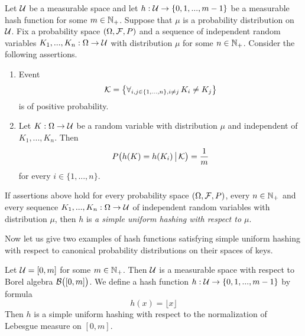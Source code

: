 \begin{definition}
Let ${\mathcal U}$ be a measurable space and let $h:{\mathcal U}\rightarrow \{0,1,...,m-1\}$ be a measurable hash function for some $m\in {\mathbb N}_+$. Suppose that $\mu$ is a probability distribution on ${\mathcal U}$. Fix a probability space $\left(\Omega,{\mathcal F},P\right)$ and a sequence of independent random variables $K_1,...,K_n:\Omega\rightarrow {\mathcal U}$ with distribution $\mu$ for some $n\in {\mathbb N}_+$. Consider the following assertions.
\begin{enumerate}[label=\textbf{(\arabic*)}, leftmargin=3.0em]
\item Event
$${\mathcal K} = \big\{\forall_{i,j\in \{1,...,n\},i\neq j}\,K_i\neq K_j\big\}$$
is of positive probability.
\item Let $K:\Omega\rightarrow {\mathcal U}$ be a random variable with distribution $\mu$ and independent of $K_1,...,K_n$. Then
$$P\big(h(K) = h(K_i)\,\big|\,{\mathcal K}\big) =\frac{1}{m}$$
for every $i\in \{1,...,n\}$.
\end{enumerate}
If assertions above hold for every probability space $(\Omega,{\mathcal F},P)$, every $n\in {\mathbb N}_+$ and every sequence $K_1,...,K_n:\Omega\rightarrow {\mathcal U}$ of independent random variables with distribution $\mu$, then $h$ is \textit{a simple uniform hashing with respect to $\mu$}.
\end{definition}
\noindent
Now let us give two examples of hash functions satisfying simple uniform hashing with respect to canonical probability distributions on their spaces of keys.

\begin{example}\label{example:real_interval_with_floor_hash_function_as_an_example_of_suh}
Let ${\mathcal U} = [0,m]$ for some $m\in {\mathbb N}_+$. Then ${\mathcal U}$ is a measurable space with respect to Borel algebra ${\mathcal B}\big([0,m]\big)$. We define a hash function $h:{\mathcal U}\rightarrow \{0,1,...,m-1\}$ by formula
$$h(x) = \lfloor x \rfloor$$
Then $h$ is a simple uniform hashing with respect to the normalization of Lebesgue measure on $[0,m]$.
\end{example}

